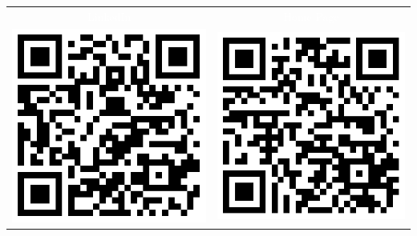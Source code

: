 \documentclass[a4paper]{article}
\begin{document}
\begin{tabular}{c|c}  
	\cellcolor{black}\textcolor{white}{LinkedIn} & \cellcolor{black}\textcolor{white}{Home Page} \\
	\includegraphics[scale=0.4]{qrcode_lnkdn.png} &  \includegraphics[scale=0.4]{qrcode_hme.png} 
\end{tabular}
\end{document}
